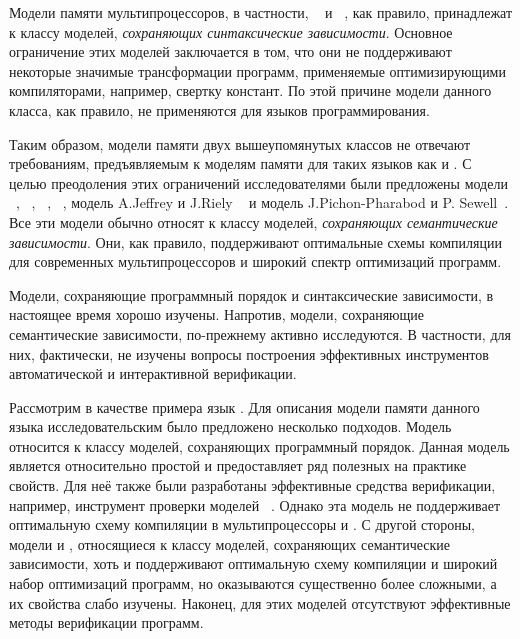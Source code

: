Модели памяти мультипроцессоров,
в частности, \ARM~\autocite{Pulte-al:POPL18} и \POWER~\autocite{Sarkar-al:PLDI11}, 
как правило, принадлежат к классу моделей, \emph{сохраняющих синтаксические зависимости}. 
Основное ограничение этих моделей заключается в том, 
что они не поддерживают некоторые значимые трансформации программ, 
применяемые оптимизирующими компиляторами, например, свертку констант.
По этой причине модели данного класса, как правило,
не применяются для языков программирования.  

Таким образом, модели памяти двух вышеупомянутых классов 
не отвечают требованиям, предъявляемым к моделям памяти для таких языков как \CPP и \Java. 
С целью преодоления этих ограничений исследователями были предложены модели  
\Prm~\autocite{Kang-al:POPL17}, \Wkm~\autocite{Chakraborty-Vafeiadis:POPL19}, 
\MRD~\autocite{Paviotti-al:ESOP20}, \PwP~\autocite{Jagadeesan-al:OOPSLA2020},
модель A.Jeffrey и J.Riely ~\autocite{Jeffrey-Riely:LICS16} и
модель J.Pichon-Pharabod и P. Sewell~\autocite{PichonPharabod-Sewell:POPL16}.
Все эти модели обычно относят к классу моделей, \emph{сохраняющих семантические зависимости}.
Они, как правило, поддерживают оптимальные схемы компиляции
для современных мультипроцессоров и широкий спектр оптимизаций программ.

Модели, сохраняющие программный порядок и синтаксические зависимости, 
в настоящее время хорошо изучены. Напротив, модели, 
сохраняющие семантические зависимости, по-прежнему активно исследуются.
В частности, для них, фактически, не изучены
вопросы построения эффективных инструментов автоматической и интерактивной верификации. 


Рассмотрим в качестве примера язык \CPP.
Для описания модели памяти данного языка исследовательским
 было предложено несколько подходов.
Модель \RCMM~\autocite{Lahav-al:PLDI17}
относится к классу моделей, сохраняющих программный порядок.
Данная модель является относительно простой и
предоставляет ряд  полезных на практике свойств.
Для неё также были разработаны эффективные
средства верификации, например, инструмент проверки моделей \genmc~\autocite{Kokologiannakis:PLDI2019}.
Однако эта модель не поддерживает оптимальную схему компиляции в мультипроцессоры \ARM и \POWER.
С другой стороны, модели \Prm и \Wkm, относящиеся к классу моделей,
сохраняющих семантические зависимости,
хоть и поддерживают оптимальную схему компиляции и широкий набор оптимизаций программ, но оказываются существенно более сложными, а их свойства слабо изучены.
Наконец, для этих моделей отсутствуют эффективные методы верификации программ. 

